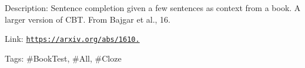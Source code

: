 Description\+: Sentence completion given a few sentences as context from a book. A larger version of C\+BT. From Bajgar et al., 16.

Link\+: \href{https://arxiv.org/abs/1610.00956}{\tt https\+://arxiv.\+org/abs/1610.}

Tags\+: \#\+Book\+Test, \#\+All, \#\+Cloze 